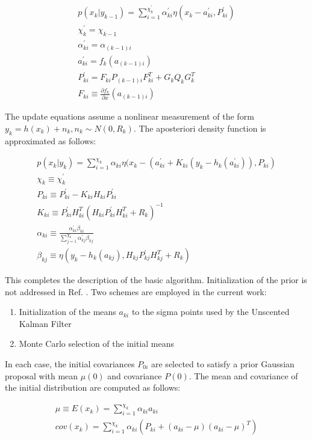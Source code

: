 \documentclass[]{article}
\begin{document}
\begin{align}
	p(x_{k} | y_{k-1}) = \sum_{i=1}^{\chi_{k}^{'}} \alpha_{ki}^{'} \eta(x_{k}-a_{ki}^{'},P_{ki}^{'}) \\
	\chi_{k}^{'} = \chi_{k-1} \\
	\alpha_{ki}^{'} = \alpha_{(k-1)i} \\
	a_{ki}^{'} = f_k(a_{(k-1)i})\\
	P_{ki}^{'} = F_{ki}P_{(k-1)i}F_{ki}^T + G_{k} Q_k G_{k}^T \\
	F_{ki} \equiv \frac{\partial f_k}{\partial x} (a_{(k-1)i})
\end{align}

The update equations assume a nonlinear measurement of the form $y_k = h(x_k) + n_k, n_k \sim N(0,R_k)$. The aposteriori density function is approximated as follows:

\begin{align}
	p(x_{k} | y_{k}) = \sum_{i=1}^{\chi_{k}} \alpha_{ki} \eta(x_k-(a_{ki}^{'}+K_{ki}(y_k-h_k(a_{ki}^{'})),P_{ki}) \\
	\chi_k \equiv \chi_{k}^{'} \\
	P_{ki} \equiv P_{ki}^{'} - K_{ki} H_{ki} P_{ki}^{'} \\
	K_{ki} \equiv P_{ki}^{'} H_{ki}^T (H_{ki} P_{ki}^{'} H_{ki}^T + R_k)^{-1} \\
	\alpha_{ki} \equiv \frac{\alpha_{ki}^{'} \beta_{ki}}{\sum_{j=1}^{\chi_k} \alpha_{kj}^{'} \beta_{kj} } \\
	\beta_{kj} \equiv \eta(y_k - h_k(a_{kj}),H_{kj}P_{kj}^{'}H_{kj}^T + R_k)
\end{align}

This completes the description of the basic algorithm. Initialization of the prior is not addressed in Ref. \cite{alspach}. Two schemes are employed in the current work:

\begin{enumerate}
	\item Initialization of the means $a_{ki}$ to the sigma points used by the Unscented Kalman Filter
	\item Monte Carlo selection of the initial means
\end{enumerate}

In each case, the initial covariances $P_{0i}$ are selected to satisfy a prior Gaussian proposal with mean $\mu(0)$ and covariance $P(0)$. The mean and covariance of the initial distribution are computed as follows:

\begin{align}
	\mu \equiv E(x_k) = \sum_{i=1}^{\chi_k} \alpha_{ki} a_{ki} \\
	cov(x_k) = \sum_{i=1}^{\chi_k} \alpha_{ki} (P_{ki} + (a_{ki}-\mu)(a_{ki}-\mu)^T) \label{eq:cov_gmm}
\end{align}
\end{document}
